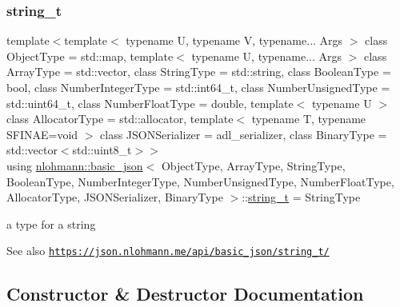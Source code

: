 \subsubsection{\texorpdfstring{string\+\_\+t}{string\_t}}
{\footnotesize\ttfamily template$<$template$<$ typename U, typename V, typename... Args $>$ class Object\+Type = std\+::map, template$<$ typename U, typename... Args $>$ class Array\+Type = std\+::vector, class String\+Type  = std\+::string, class Boolean\+Type  = bool, class Number\+Integer\+Type  = std\+::int64\+\_\+t, class Number\+Unsigned\+Type  = std\+::uint64\+\_\+t, class Number\+Float\+Type  = double, template$<$ typename U $>$ class Allocator\+Type = std\+::allocator, template$<$ typename T, typename S\+F\+I\+N\+A\+E=void $>$ class J\+S\+O\+N\+Serializer = adl\+\_\+serializer, class Binary\+Type  = std\+::vector$<$std\+::uint8\+\_\+t$>$$>$ \\
using \hyperlink{classnlohmann_1_1basic__json}{nlohmann\+::basic\+\_\+json}$<$ Object\+Type, Array\+Type, String\+Type, Boolean\+Type, Number\+Integer\+Type, Number\+Unsigned\+Type, Number\+Float\+Type, Allocator\+Type, J\+S\+O\+N\+Serializer, Binary\+Type $>$\+::\hyperlink{classnlohmann_1_1basic__json_a33593865ffb1860323dcbd52425b90c8}{string\+\_\+t} =  String\+Type}



a type for a string 

\begin{DoxySeeAlso}{See also}
\href{https://json.nlohmann.me/api/basic_json/string_t/}{\tt https\+://json.\+nlohmann.\+me/api/basic\+\_\+json/string\+\_\+t/} 
\end{DoxySeeAlso}


\subsection{Constructor \& Destructor Documentation}
\mbox{\label{classnlohmann_1_1basic__json_a19734fbc9c97d536832892ddacd6b62a}} 

